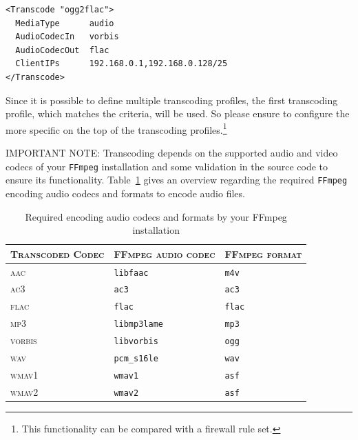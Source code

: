 \documentclass[a4paper,oneside,10pt]{report}
\newenvironment{colframefile}{%
  \begin{Sbox}
    \begin{minipage}{.99\columnwidth}
}{%
  \end{minipage}
  \end{Sbox}
  \begin{center}
    \fcolorbox{black}{Yellow}{\TheSbox}
  \end{center}
}
\newenvironment{colframeimportantnote}{%
  \begin{Sbox}
    \begin{minipage}{.99\columnwidth}
}{%
  \end{minipage}
  \end{Sbox}
  \begin{center}
    \fcolorbox{black}{Orange}{\TheSbox}
  \end{center}
}
\begin{document}
\begin{colframefile}
\begin{verbatim}
<Transcode "ogg2flac">
  MediaType      audio
  AudioCodecIn   vorbis
  AudioCodecOut  flac
  ClientIPs      192.168.0.1,192.168.0.128/25
</Transcode>
\end{verbatim}
\end{colframefile}

Since it is possible to define multiple transcoding profiles, the first transcoding profile, which matches the criteria, will be used. So please ensure to configure the more specific on the top of the transcoding profiles.\footnote{This functionality can be compared with a firewall rule set.}

\begin{colframeimportantnote}
\textsc{IMPORTANT NOTE:} Transcoding depends on the supported audio and video codecs of your \verb|FFmpeg| installation and some validation in the source code to ensure its functionality. Table~\ref{tab:requiredffmpegaudio} gives an overview regarding the required \verb|FFmpeg| encoding audio codecs and formats to encode audio files.
\end{colframeimportantnote}

\begin{table}
	\centering
	\begin{tabular}{|p{10em}|p{11em}|p{10em}|}
		\hline
		\textsc{Transcoded Codec} & \textsc{FFmpeg audio codec} & \textsc{FFmpeg format} \\
		\hline
		\hline
		\textsc{aac} 							& \verb|libfaac| 							& \verb|m4v| \\
		\hline
		\textsc{ac3} 							& \verb|ac3|									& \verb|ac3| \\
		\hline
		\textsc{flac} 						& \verb|flac|									& \verb|flac| \\
		\hline
		\textsc{mp3} 							& \verb|libmp3lame|						& \verb|mp3| \\
		\hline
		\textsc{vorbis} 					& \verb|libvorbis|						& \verb|ogg| \\
		\hline
		\textsc{wav} 							& \verb|pcm_s16le|						& \verb|wav| \\
		\hline
		\textsc{wmav1} 						& \verb|wmav1|								& \verb|asf| \\
		\hline
		\textsc{wmav2} 						& \verb|wmav2|								& \verb|asf| \\
		\hline
	\end{tabular}
	\caption{Required encoding audio codecs and formats by your FFmpeg installation}
	\label{tab:requiredffmpegaudio}
\end{table}
\end{document}
